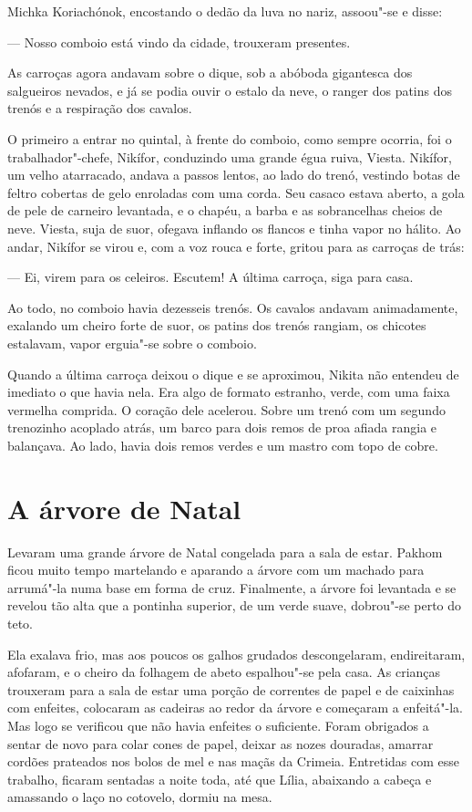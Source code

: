 Michka Koriachónok, encostando o dedão da luva no nariz, assoou"-se e
disse:

--- Nosso comboio está vindo da cidade, trouxeram presentes.

As carroças agora andavam sobre o dique, sob a abóboda gigantesca dos
salgueiros nevados, e já se podia ouvir o estalo da neve, o ranger dos
patins dos trenós e a respiração dos cavalos.

O primeiro a entrar no quintal, à frente do comboio, como sempre
ocorria, foi o trabalhador"-chefe, Nikífor, conduzindo uma grande égua
ruiva, Viesta. Nikífor, um velho atarracado, andava a passos lentos, ao
lado do trenó, vestindo botas de feltro cobertas de gelo enroladas com
uma corda. Seu casaco estava aberto, a gola de pele de carneiro
levantada, e o chapéu, a barba e as sobrancelhas cheios de neve. Viesta,
suja de suor, ofegava inflando os flancos e tinha vapor no hálito. Ao
andar, Nikífor se virou e, com a voz rouca e forte, gritou para as
carroças de trás:

--- Ei, virem para os celeiros. Escutem! A última carroça, siga para
casa.

Ao todo, no comboio havia dezesseis trenós. Os cavalos andavam
animadamente, exalando um cheiro forte de suor, os patins dos trenós
rangiam, os chicotes estalavam, vapor erguia"-se sobre o comboio.

Quando a última carroça deixou o dique e se aproximou, Nikita não
entendeu de imediato o que havia nela. Era algo de formato estranho,
verde, com uma faixa vermelha comprida. O coração dele acelerou. Sobre
um trenó com um segundo trenozinho acoplado atrás, um barco para
dois remos de proa afiada rangia e balançava. Ao lado, havia dois remos
verdes e um mastro com topo de cobre.


\chapter{A árvore de Natal}

Levaram uma grande árvore de Natal congelada para a sala de estar.
Pakhom ficou muito tempo martelando e aparando a árvore com um machado
para arrumá"-la numa base em forma de cruz. Finalmente, a árvore foi
levantada e se revelou tão alta que a pontinha superior, de um verde
suave, dobrou"-se perto do teto.

Ela exalava frio, mas aos poucos os galhos grudados descongelaram,
endireitaram, afofaram, e o cheiro da folhagem de abeto espalhou"-se pela
casa. As crianças trouxeram para a sala de estar uma porção de correntes
de papel e de caixinhas com enfeites, colocaram as cadeiras ao redor da
árvore e começaram a enfeitá"-la. Mas logo se verificou que não havia
enfeites o suficiente. Foram obrigados a sentar de novo para colar cones
de papel, deixar as nozes douradas, amarrar cordões prateados nos bolos
de mel e nas maçãs da Crimeia. Entretidas com esse trabalho, ficaram
sentadas a noite toda, até que Lília, abaixando a cabeça e amassando o
laço no cotovelo, dormiu na mesa.

